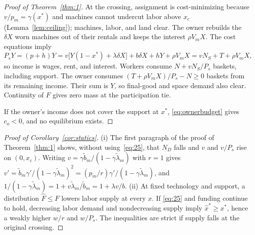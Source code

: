 \documentclass[12pt]{article}
\theoremstyle{plain}
\theoremstyle{definition}
\theoremstyle{remark}
\begin{document}
\begin{proof}[Proof of Theorem~\ref{thm:1}]
At the crossing, assignment is cost-minimizing because $v/p_m=\gamma(x^*)$ and machines cannot undercut labor above $x_c$ (Lemma~\ref{lem:ceiling}); machines, labor, and land clear. The owner rebuilds the $\delta X$ worn machines out of their rentals and keeps the interest $\rho V_mX$. The cost equations imply
\[
P_sY=(p+h)Y=v\bigl[Y(1-x^*)+\lambda\delta X\bigr]+b\delta X+hY+\rho V_mX=vN_S+T+\rho V_mX,
\]
so income is wages, rent, and interest. Workers consume $N+vN_S/P_s$ baskets, including support. The owner consumes $(T+\rho V_mX)/P_s-N\ge0$ baskets from its remaining income. Their sum is $Y$, so final-good and space demand also clear. Continuity of $F$ gives zero mass at the participation tie.

If the owner's income does not cover the support at $x^*$, \eqref{eq:ownerbudget} gives $c_o<0$, and no equilibrium exists.
\end{proof}

\begin{proof}[Proof of Corollary~\ref{cor:statics}]
(i) The first paragraph of the proof of Theorem~\ref{thm:1} shows, without using~\eqref{eq:25}, that $N_D$ falls and $v$ and $v/P_s$ rise on $(0,x_c)$. Writing $v=\gamma\widetilde b_m/(1-\gamma\widetilde\lambda_m)$ with $r=1$ gives $v'=\widetilde b_m\gamma'/(1-\gamma\widetilde\lambda_m)^2=(p_m/r)\gamma'/(1-\gamma\widetilde\lambda_m)$, and $1/(1-\gamma\widetilde\lambda_m)=1+v\widetilde\lambda_m/\widetilde b_m=1+\lambda v/b$.
(ii) At fixed technology and support, a distribution $\widehat{F}\le F$ lowers labor supply at every $x$. If \eqref{eq:25} and funding continue to hold, decreasing labor demand and nondecreasing supply imply $\widehat{x}^*\ge x^*$, hence a weakly higher $w/r$ and $w/P_s$. The inequalities are strict if supply falls at the original crossing.
\end{proof}
\end{document}
